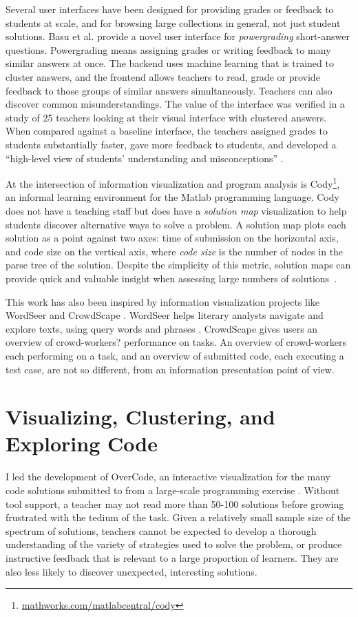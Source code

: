 \documentclass{sigchi}
\begin{document}
Several user interfaces have been designed for providing grades or feedback to students at scale, and for browsing large collections in general, not just student solutions. Basu et al. \citeyear{basupowergrading} provide a novel user interface for {\it powergrading} short-answer questions. Powergrading means assigning grades or writing feedback to many similar answers at once. The backend uses machine learning that is trained to cluster answers, and the frontend allows teachers to read, grade or provide feedback to those groups of similar answers simultaneously. Teachers can also discover common misunderstandings. The value of the interface was verified in a study of 25 teachers looking at their visual interface with clustered answers. When compared against a baseline interface, the teachers assigned grades to students substantially faster, gave more feedback to students, and developed a ``high-level view of students' understanding and misconceptions'' \cite{basuDivideAndConquer}.

At the intersection of information visualization and program analysis is Cody\footnote{\url{mathworks.com/matlabcentral/cody}}, an informal learning environment for the Matlab programming language. Cody does not have a teaching staff but does have a {\em solution map} visualization to help students discover alternative ways to solve a problem. A solution map plots each solution as a point against two axes: time of submission on the horizontal axis, and code size on the vertical axis, where \textit{code size} is the number of nodes in the parse tree of the solution. Despite the simplicity of this metric, solution maps can provide quick and valuable insight when assessing large numbers of solutions~\cite{ICERGlassman}.

This work has also been inspired by information visualization projects like WordSeer \cite{wordseerlitcomp13,wordseercikm13} and CrowdScape \cite{crowdscape}. WordSeer helps literary analysts navigate and explore texts, using query words and phrases \cite{wordseerhcir11}. CrowdScape gives users an overview of crowd-workers? performance on tasks. An overview of crowd-workers each performing on a task, and an overview of submitted code, each executing a test case, are not so different, from an information presentation point of view.

\section{Visualizing, Clustering, and Exploring Code}
I led the development of OverCode, an interactive visualization for the many code solutions submitted to from a large-scale programming exercise \cite{OverCode}. Without tool support, a teacher may not read more than 50-100 solutions before growing frustrated with the tedium of the task. Given a relatively small sample size of the spectrum of solutions, teachers cannot be expected to develop a thorough understanding of the variety of strategies used to solve the problem, or produce instructive feedback that is relevant to a large proportion of learners. They are also less likely to discover unexpected, interesting solutions.
\end{document}
